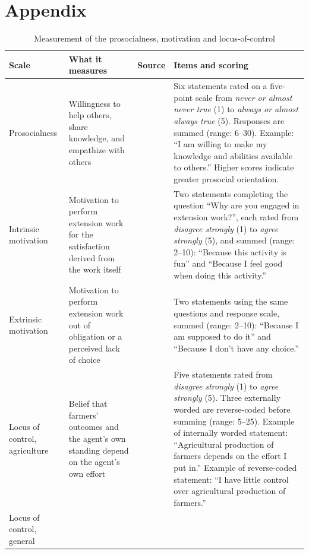 \documentclass[11pt]{article}
\begin{document}
\section{Appendix}\label{sec:appendix}

\begin{table}[H]
\caption{Measurement of the prosocialness, motivation and locus-of-control}
\label{tab:scales}
\footnotesize
\begin{tabular}{@{}p{2.5cm}p{3.3cm}p{3cm}p{7.05cm}@{}}
\toprule
Scale & What it measures & Source & Items and scoring \\
\midrule
Prosocialness
& Willingness to help others, share knowledge, and empathize with others
& \citet{caprara_new_2005}
& Six statements rated on a five-point scale from
  \emph{never or almost never true} (1) to \emph{always or almost always true} (5). Responses are summed (range: 6--30). Example: ``I am willing to make my knowledge and abilities available to others.'' Higher scores indicate greater prosocial orientation. \\
\addlinespace
Intrinsic motivation
& Motivation to perform extension work for the satisfaction derived from the work itself
& \citet{guay_assessment_2000}
& Two statements completing the question ``Why are you engaged in extension work?'', each rated from \emph{disagree strongly} (1) to \emph{agree strongly} (5), and summed (range: 2--10): ``Because this activity is fun'' and ``Because I feel good when doing this
  activity.'' \\
\addlinespace
Extrinsic motivation
& Motivation to perform extension work out of obligation or a perceived lack of choice
& \citet{guay_assessment_2000}
& Two statements using the same questions and response scale, summed (range: 2--10): ``Because I am supposed to do it'' and ``Because I don't have any choice.'' \\
\addlinespace
Locus of control, agriculture
& Belief that farmers' outcomes and the agent's own standing depend on the agent's own effort
& \citet{rotter_generalized_1966}
& Five statements rated from \emph{disagree strongly} (1) to \emph{agree strongly} (5). Three externally worded are reverse-coded before summing (range: 5--25). Example of internally worded statement: ``Agricultural production of farmers depends on the effort I put in.'' Example of reverse-coded statement: ``I have little control over agricultural production of farmers.''  \\
\addlinespace
Locus of control, general

\end{tabular}
\end{table}
\end{document}
